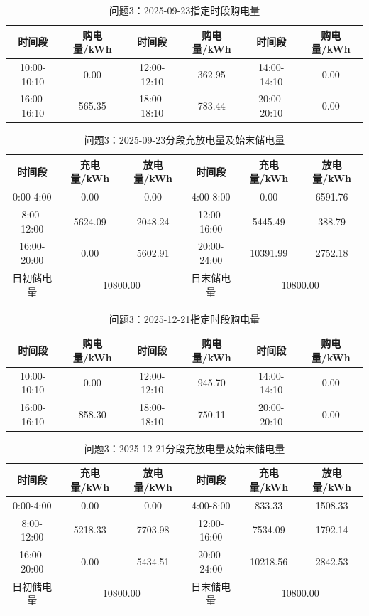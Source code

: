 \begin{table}[H]\centering\scriptsize
\caption{问题3：2025-09-23指定时段购电量}
\begin{tabular}{cc|cc|cc}\toprule
时间段&购电量/kWh&时间段&购电量/kWh&时间段&购电量/kWh\\\midrule
10:00-10:10 & 0.00 & 12:00-12:10 & 362.95 & 14:00-14:10 & 0.00 \\
16:00-16:10 & 565.35 & 18:00-18:10 & 783.44 & 20:00-20:10 & 0.00 \\
\bottomrule\end{tabular}\end{table}
\begin{table}[H]\centering\scriptsize
\caption{问题3：2025-09-23分段充放电量及始末储电量}
\begin{tabular}{ccc|ccc}\toprule
时间段&充电量/kWh&放电量/kWh&时间段&充电量/kWh&放电量/kWh\\\midrule
0:00-4:00 & 0.00 & 0.00 & 4:00-8:00 & 0.00 & 6591.76 \\
8:00-12:00 & 5624.09 & 2048.24 & 12:00-16:00 & 5445.49 & 388.79 \\
16:00-20:00 & 0.00 & 5602.91 & 20:00-24:00 & 10391.99 & 2752.18 \\
\midrule 日初储电量&\multicolumn{2}{c|}{10800.00}&日末储电量&\multicolumn{2}{c}{10800.00}\\\bottomrule\end{tabular}\end{table}
\begin{table}[H]\centering\scriptsize
\caption{问题3：2025-12-21指定时段购电量}
\begin{tabular}{cc|cc|cc}\toprule
时间段&购电量/kWh&时间段&购电量/kWh&时间段&购电量/kWh\\\midrule
10:00-10:10 & 0.00 & 12:00-12:10 & 945.70 & 14:00-14:10 & 0.00 \\
16:00-16:10 & 858.30 & 18:00-18:10 & 750.11 & 20:00-20:10 & 0.00 \\
\bottomrule\end{tabular}\end{table}
\begin{table}[H]\centering\scriptsize
\caption{问题3：2025-12-21分段充放电量及始末储电量}
\begin{tabular}{ccc|ccc}\toprule
时间段&充电量/kWh&放电量/kWh&时间段&充电量/kWh&放电量/kWh\\\midrule
0:00-4:00 & 0.00 & 0.00 & 4:00-8:00 & 833.33 & 1508.33 \\
8:00-12:00 & 5218.33 & 7703.98 & 12:00-16:00 & 7534.09 & 1792.14 \\
16:00-20:00 & 0.00 & 5434.51 & 20:00-24:00 & 10218.56 & 2842.53 \\
\midrule 日初储电量&\multicolumn{2}{c|}{10800.00}&日末储电量&\multicolumn{2}{c}{10800.00}\\\bottomrule\end{tabular}\end{table}
